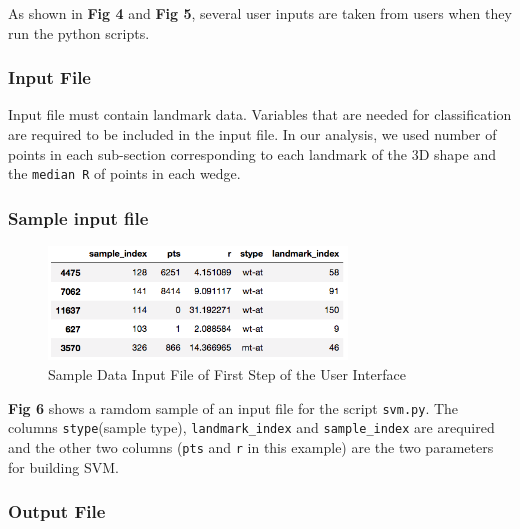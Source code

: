 \documentclass[10pt,letterpaper]{article}
\begin{document}
As shown in \textbf{Fig 4} and \textbf{Fig 5}, several user inputs are
taken from users when they run the python scripts.

\subsubsection{Input File}\label{input-file}

Input file must contain landmark data. Variables that are needed for
classification are required to be included in the input file. In our
analysis, we used number of points in each sub-section corresponding to
each landmark of the 3D shape and the \texttt{median\ R} of points in
each wedge.

\subsubsection{Sample input file}\label{sample-input-file}

\begin{figure}[h]

{\centering \includegraphics[width=300px]{figures/Figure3} 

}

\caption{Sample Data Input File of First Step of the User Interface}\label{fig:inputdata}
\end{figure}

\textbf{Fig 6} shows a ramdom sample of an input file for the script
\texttt{svm.py}. The columns \texttt{stype}(sample type),
\texttt{landmark\_index} and \texttt{sample\_index} are arequired and
the other two columns (\texttt{pts} and \texttt{r} in this example) are
the two parameters for building SVM.

\subsubsection{Output File}\label{output-file}
\end{document}
